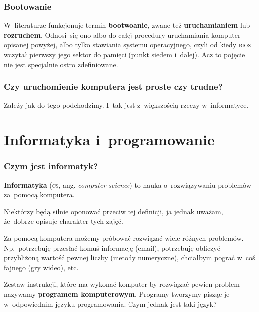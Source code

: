\documentclass[10pt,t]{beamer}
\begin{document}
\begin{frame}
  \frametitle{Bootowanie}


  W~literaturze funkcjonuje termin \textbf{bootwoanie}, zwane też
  \textbf{uruchamianiem} lub \textbf{rozruchem}. Odnosi~się ono albo do
  całej procedury uruchamiania komputer opisanej powyżej, albo tylko
  stawiania systemu operacyjnego, czyli od kiedy \textsc{bios} wczytał
  pierwszy jego sektor do pamięci (punkt siedem i~dalej). Acz to pojęcie
  nie jest specjalnie ostro zdefiniowane.

\end{frame}





\begin{frame}
  \frametitle{Czy uruchomienie komputera jest proste czy trudne?}


  Zależy jak do tego podchodzimy. I~tak jest z~większością rzeczy
  w~informatyce.

\end{frame}










\section{Informatyka i~programowanie}



\begin{frame}
  \frametitle{Czym jest informatyk?}


  \textbf{Informatyka} (\textsc{cs}, ang. \textit{computer science}) to
  nauka o~rozwiązywaniu problemów za~pomocą komputera.

  Niektórzy będą silnie oponować przeciw tej definicji, ja jednak uważam,
  że~dobrze opisuje charakter tych zajęć.

  Za pomocą komputera możemy próbować rozwiązać wiele różnych problemów.
  Np.~potrzebuję przesłać komuś informację (email), potrzebuję obliczyć
  przybliżoną wartość pewnej liczby (metody numeryczne), chciałbym
  pograć w~coś fajnego (gry wideo), etc.

  Zestaw instrukcji, które ma wykonać komputer by rozwiązać pewien problem
  nazywamy \textbf{programem komputerowym}. Programy tworzymy pisząc je
  w~odpowiednim języku programowania. Czym jednak jest taki język?

\end{frame}
\end{document}
